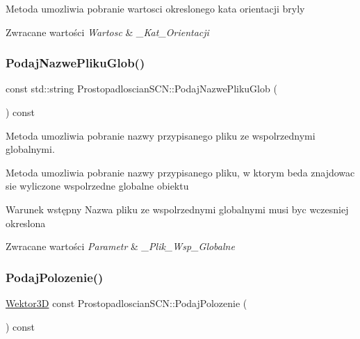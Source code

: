 Metoda umozliwia pobranie wartosci okreslonego kata orientacji bryly 
\begin{DoxyRetVals}{Zwracane wartości}
{\em Wartosc} & {\itshape \+\_\+\+Kat\+\_\+\+Orientacji} \\
\hline
\end{DoxyRetVals}
\mbox{\label{classProstopadloscianSCN_a203c4bf0a0e65ed9896199e7a6dc498b}} 
\subsubsection{\texorpdfstring{Podaj\+Nazwe\+Pliku\+Glob()}{PodajNazwePlikuGlob()}}
{\footnotesize\ttfamily const std\+::string Prostopadloscian\+S\+C\+N\+::\+Podaj\+Nazwe\+Pliku\+Glob (\begin{DoxyParamCaption}{ }\end{DoxyParamCaption}) const\hspace{0.3cm}{\ttfamily [inline]}}



Metoda umozliwia pobranie nazwy przypisanego pliku ze wspolrzednymi globalnymi. 

Metoda umozliwia pobranie nazwy przypisanego pliku, w ktorym beda znajdowac sie wyliczone wspolrzedne globalne obiektu \begin{DoxyPrecond}{Warunek wstępny}
Nazwa pliku ze wspolrzednymi globalnymi musi byc wczesniej okreslona 
\end{DoxyPrecond}

\begin{DoxyRetVals}{Zwracane wartości}
{\em Parametr} & {\itshape \+\_\+\+Plik\+\_\+\+Wsp\+\_\+\+Globalne} \\
\hline
\end{DoxyRetVals}
\mbox{\label{classProstopadloscianSCN_ae0157d734326422f325c9af1894292ed}} 
\subsubsection{\texorpdfstring{Podaj\+Polozenie()}{PodajPolozenie()}}
{\footnotesize\ttfamily \hyperlink{classSWektor}{Wektor3D} const Prostopadloscian\+S\+C\+N\+::\+Podaj\+Polozenie (\begin{DoxyParamCaption}{ }\end{DoxyParamCaption}) const\hspace{0.3cm}{\ttfamily [inline]}}



